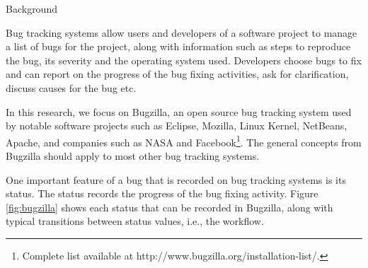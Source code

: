 \begin{section}{Background} \label{sec:background}


Bug tracking systems allow users and developers of a software project to manage a list of bugs for the project, along with information such as steps to reproduce the bug, its severity and the operating system used. Developers choose bugs to fix and can report on the progress of the bug fixing activities, ask for clarification, discuss causes for the bug etc.

In this research, we focus on Bugzilla, an open source bug tracking system used by notable software projects such as Eclipse, Mozilla, Linux Kernel, NetBeans, Apache, and companies such as NASA and Facebook\footnote{Complete list available at http://www.bugzilla.org/installation-list/.}. The general concepts from Bugzilla should apply to most other bug tracking systems.

One important feature of a bug that is recorded on bug tracking systems is its status. The status records the progress of the bug fixing activity.
Figure \ref{fig:bugzilla} shows each status that can be recorded in Bugzilla, along with typical transitions between status values, i.e., the workflow.


\end{section}
